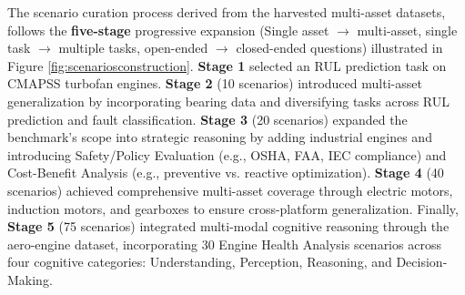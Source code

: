 \documentclass[sigconf,review]{acmart}
\begin{document}

The scenario curation process derived from the harvested multi-asset datasets, follows the \textbf{five-stage} progressive expansion (Single asset $\rightarrow$ multi-asset, single task $\rightarrow$ multiple tasks, open-ended $\rightarrow$ closed-ended questions) illustrated in Figure \ref{fig:scenariosconstruction}. \textbf{Stage 1} selected an RUL prediction task on CMAPSS turbofan engines. \textbf{Stage 2} (10 scenarios) introduced multi-asset generalization by incorporating bearing data and diversifying tasks across RUL prediction and fault classification. \textbf{Stage 3} (20 scenarios) expanded the benchmark’s scope into strategic reasoning by adding industrial engines and introducing Safety/Policy Evaluation (e.g., OSHA, FAA, IEC compliance) and Cost-Benefit Analysis (e.g., preventive vs. reactive optimization). \textbf{Stage 4} (40 scenarios) achieved comprehensive multi-asset coverage through electric motors, induction motors, and gearboxes to ensure cross-platform generalization. Finally, \textbf{Stage 5} (75 scenarios) integrated multi-modal cognitive reasoning through the aero-engine dataset, incorporating 30 Engine Health Analysis scenarios across four cognitive categories: Understanding, Perception, Reasoning, and Decision-Making. 


\end{document}
